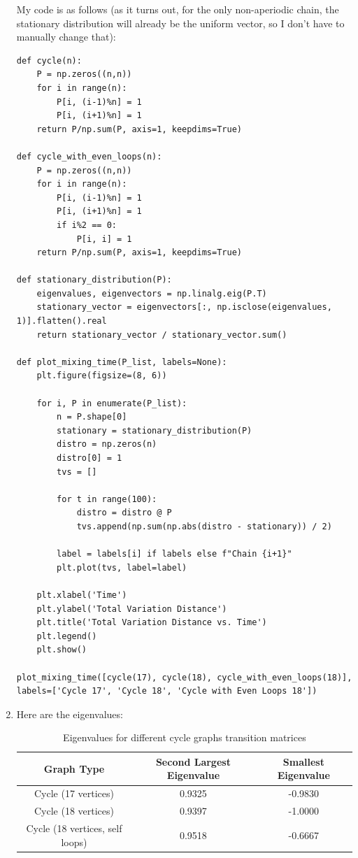 \documentclass[12pt]{article}
\begin{document}
\begin{enumerate}[label=(\alph*)]
        My code is as follows (as it turns out, for the only non-aperiodic chain, the stationary distribution will already be the uniform vector, so I don't have to manually change that):
        \begin{lstlisting}
def cycle(n):
    P = np.zeros((n,n))
    for i in range(n):
        P[i, (i-1)%n] = 1
        P[i, (i+1)%n] = 1
    return P/np.sum(P, axis=1, keepdims=True)

def cycle_with_even_loops(n):
    P = np.zeros((n,n))
    for i in range(n):
        P[i, (i-1)%n] = 1
        P[i, (i+1)%n] = 1
        if i%2 == 0:
            P[i, i] = 1
    return P/np.sum(P, axis=1, keepdims=True)

def stationary_distribution(P):
    eigenvalues, eigenvectors = np.linalg.eig(P.T)
    stationary_vector = eigenvectors[:, np.isclose(eigenvalues, 1)].flatten().real
    return stationary_vector / stationary_vector.sum()

def plot_mixing_time(P_list, labels=None):
    plt.figure(figsize=(8, 6))

    for i, P in enumerate(P_list):
        n = P.shape[0]
        stationary = stationary_distribution(P)
        distro = np.zeros(n)
        distro[0] = 1
        tvs = []

        for t in range(100):
            distro = distro @ P
            tvs.append(np.sum(np.abs(distro - stationary)) / 2)

        label = labels[i] if labels else f"Chain {i+1}"
        plt.plot(tvs, label=label)

    plt.xlabel('Time')
    plt.ylabel('Total Variation Distance')
    plt.title('Total Variation Distance vs. Time')
    plt.legend()
    plt.show()

plot_mixing_time([cycle(17), cycle(18), cycle_with_even_loops(18)], labels=['Cycle 17', 'Cycle 18', 'Cycle with Even Loops 18'])
        \end{lstlisting}

        \item Here are the eigenvalues: 
        \begin{table}[H]
            \centering
            \begin{tabular}{|c|c|c|}
            \hline
            \textbf{Graph Type} & \textbf{Second Largest Eigenvalue} & \textbf{Smallest Eigenvalue} \\
            \hline
            Cycle (17 vertices) & 0.9325 & -0.9830 \\
            Cycle (18 vertices) & 0.9397 & -1.0000 \\
            Cycle (18 vertices, self loops) & 0.9518 & -0.6667 \\
            \hline
            \end{tabular}
            \caption{Eigenvalues for different cycle graphs transition matrices}
            \label{tab:eigen_cycle}
            \end{table}


\end{enumerate}
\end{document}
